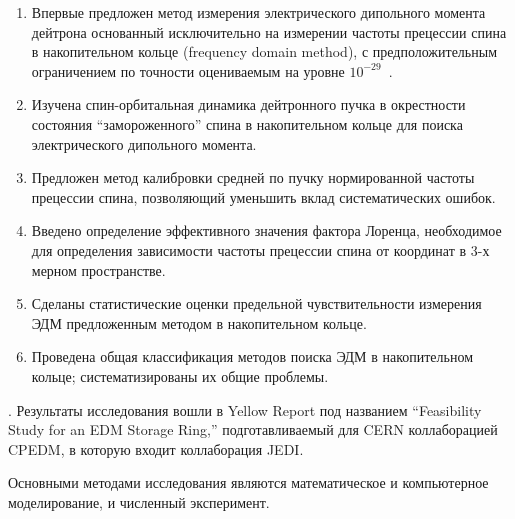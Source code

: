 {\novelty}
\begin{enumerate}
	\item Впервые предложен метод измерения электрического дипольного момента дейтрона основанный исключительно на измерении частоты прецессии спина в накопительном кольце (frequency domain method), с предположительным ограничением по точности оцениваемым на уровне $10^{-29}$~\ecm.
	\item Изучена спин-орбитальная динамика дейтронного пучка в окрестности состояния ``замороженного'' спина в накопительном кольце для поиска электрического дипольного момента. 
	\item Предложен метод калибровки средней по пучку нормированной частоты прецессии спина, позволяющий уменьшить вклад систематических ошибок.
	\item Введено определение эффективного значения фактора Лоренца, необходимое для определения зависимости частоты прецессии спина от координат в 3-х мерном пространстве. 
	\item Сделаны статистические оценки предельной чувствительности измерения ЭДМ предложенным методом в накопительном кольце. 
	\item Проведена общая классификация методов поиска ЭДМ в накопительном кольце; систематизированы их общие проблемы.
\end{enumerate}

{\influence}. Результаты исследования вошли в Yellow Report под названием ``Feasibility Study for an EDM Storage Ring,'' подготавливаемый для CERN коллаборацией CPEDM, в которую входит коллаборация JEDI.



{\methods} Основными методами исследования являются математическое и компьютерное моделирование, и численный эксперимент.

